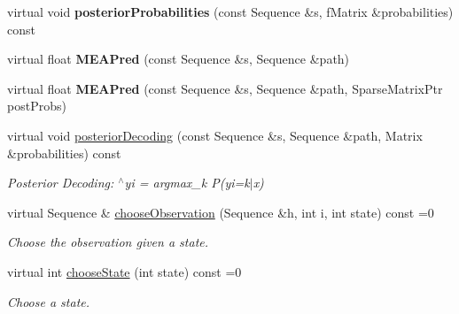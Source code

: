 \begin{DoxyCompactItemize}
\mbox{\label{classtops_1_1DecodableModel_aa11ef25681d465752483d79deb44c0dc}} 
virtual void {\bfseries posterior\+Probabilities} (const Sequence \&s, f\+Matrix \&probabilities) const
\item 
\mbox{\label{classtops_1_1DecodableModel_a4dc165277061ea987eb994df7fafca6d}} 
virtual float {\bfseries M\+E\+A\+Pred} (const Sequence \&s, Sequence \&path)
\item 
\mbox{\label{classtops_1_1DecodableModel_a3c2e4577dda5374cac0287e0fc1ec04f}} 
virtual float {\bfseries M\+E\+A\+Pred} (const Sequence \&s, Sequence \&path, Sparse\+Matrix\+Ptr post\+Probs)
\item 
\mbox{\label{classtops_1_1DecodableModel_a0e243fa34e02349602faae53cae86a41}} 
virtual void \hyperlink{classtops_1_1DecodableModel_a0e243fa34e02349602faae53cae86a41}{posterior\+Decoding} (const Sequence \&s, Sequence \&path, Matrix \&probabilities) const
\begin{DoxyCompactList}\small\item\em Posterior Decoding\+: $^\wedge$yi = argmax\+\_\+k P(yi=k$\vert$x) \end{DoxyCompactList}\item 
virtual Sequence \& \hyperlink{classtops_1_1DecodableModel_a9321fd7bca21551b4c5380e1f48ff5c2}{choose\+Observation} (Sequence \&h, int i, int state) const =0
\begin{DoxyCompactList}\small\item\em Choose the observation given a state. \end{DoxyCompactList}\item 
\mbox{\label{classtops_1_1DecodableModel_a7bac54cfa355803764cf8677d58cbe70}} 
virtual int \hyperlink{classtops_1_1DecodableModel_a7bac54cfa355803764cf8677d58cbe70}{choose\+State} (int state) const =0
\begin{DoxyCompactList}\small\item\em Choose a state. \end{DoxyCompactList}\item 
\mbox{\label{classtops_1_1DecodableModel_ac31959a6d852e2e00938294bd54f2667}} 

\end{DoxyCompactItemize}

